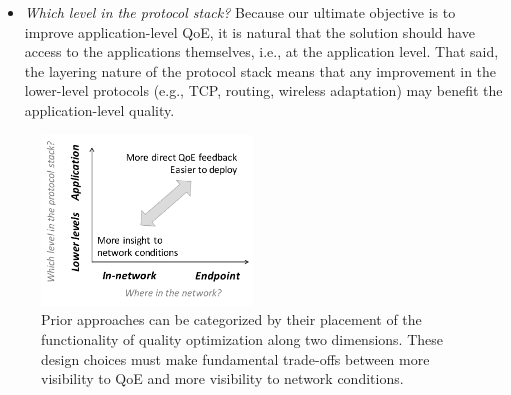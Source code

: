 \begin{itemize}
\item {\em Which level in the protocol stack?}
Because our ultimate objective is to improve application-level QoE, 
it is natural that the solution should have access to the applications themselves,
i.e., at the application level.
That said, the layering nature of the protocol stack means that any improvement in 
the lower-level protocols (e.g., TCP, routing, wireless adaptation) may benefit the 
application-level quality.

\end{itemize}




\begin{figure}[t!]
\centering
\includegraphics[width=0.5\textwidth]{figures/back-tradeoff.pdf}
\caption{Prior approaches can be categorized by their placement of
the functionality of quality optimization along two dimensions.
These design choices must make fundamental trade-offs between 
more visibility to QoE and more visibility to network conditions.}
\label{fig:back-tradeoff}
\end{figure}

